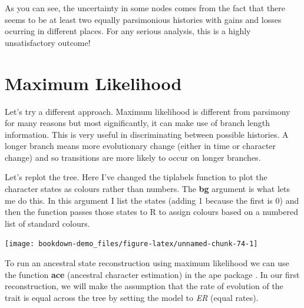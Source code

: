 \documentclass[
]{book}
\newenvironment{Shaded}{\begin{snugshade}}{\end{snugshade}}
\newcommand{\DataTypeTok}[1]{\textcolor[rgb]{0.13,0.29,0.53}{#1}}
\newcommand{\DecValTok}[1]{\textcolor[rgb]{0.00,0.00,0.81}{#1}}
\newcommand{\FloatTok}[1]{\textcolor[rgb]{0.00,0.00,0.81}{#1}}
\newcommand{\KeywordTok}[1]{\textcolor[rgb]{0.13,0.29,0.53}{\textbf{#1}}}
\newcommand{\NormalTok}[1]{#1}
\newcommand{\OperatorTok}[1]{\textcolor[rgb]{0.81,0.36,0.00}{\textbf{#1}}}
\begin{document}
As you can see, the uncertainty in some nodes comes from the fact that there seems to be at least two equally parsimonious histories with gains and losses ocurring in different places. For any serious analysis, this is a highly unsatisfactory outcome!

\hypertarget{maximum-likelihood}{%
\section{Maximum Likelihood}\label{maximum-likelihood}}

Let's try a different approach. Maximum likelihood is different from parsimony for many reasons but most significantly, it can make use of branch length information. This is very useful in discriminating between possible histories. A longer branch means more evolutionary change (either in time or character change) and so transitions are more likely to occur on longer branches.

Let's replot the tree. Here I've changed the tiplabels function to plot the character states as colours rather than numbers. The \textbf{bg} argument is what lets me do this. In this argument I list the states (adding 1 because the first is 0) and then the function passes those states to R to assign colours based on a numbered list of standard colours.

\begin{Shaded}
\end{Shaded}

\begin{center}\texttt{[image: bookdown-demo\_files/figure-latex/unnamed-chunk-74-1]} \end{center}

To run an ancestral state reconstruction using maximum likelihood we can use the function \textbf{ace} (ancestral character estimation) in the ape package \citep{ape}. In our first reconstruction, we will make the assumption that the rate of evolution of the trait is equal across the tree by setting the model to \emph{ER} (equal rates).
\end{document}
